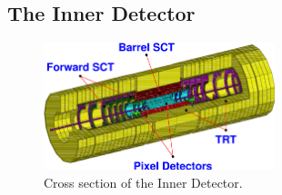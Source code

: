 \subsection{The Inner Detector}
\begin{figure}[h]
\begin{center}
\includegraphics*[width=0.60\textwidth] {figures/inner_3D}%
\caption[Cross section of the Inner Detector.]{Cross section of the Inner Detector.}
\label{fig:ID_cs}
\end{center}
\end{figure}


